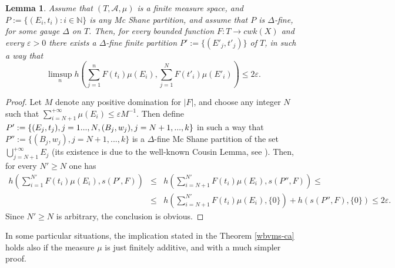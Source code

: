 \documentclass[11pt,a4paper,twoside]{amsart}
\newtheorem{lemma}[theorem]{Lemma}
\begin{document}
\begin{lemma}\label{potyrala}
Assume that $(T,\mathcal{A},\mu)$ is a finite measure space, and $P:=\{(E_i,t_i):i\in \mathbb{N}\}$ is any Mc Shane partition,
and assume that $P$ is $\Delta$-fine, for some gauge $\Delta $ on $T$. Then, for every bounded function $F:T\to cwk(X)$ and every ${\varepsilon}>0$ there exists a $\Delta$-fine finite partition $P':=\{(E'_j,t'_j)\}$ of $T$, in such a way that 
$$\limsup_nh\left(\sum_{j=1}^nF(t_i)\mu(E_i),\sum_{j=1}^NF(t'_i)\mu(E'_i)\right)\leq 2{\varepsilon}.$$
\end{lemma}
\begin{proof}
Let $M$ denote any positive domination for $|F|$, and choose any integer $N$ such that $\sum_{i=N+1}^{+\infty}\mu(E_i)\leq {\varepsilon} M^{-1}.$ Then define $P':=\{(E_j,t_j), j=1...,N, (B_j,w_j), \\ j=N+1,...,k\}$ in such a way that $P'':=\{(B_j,w_j), j=N+1,...,k\}$ is a $\Delta$-fine  Mc Shane partition of the set $\bigcup_{j=N+1}^{+\infty}E_j$ (its existence is due to the well-known Cousin Lemma,  see \cite[ Proposition 1.7]{riecan}). Then, for every $N'\geq N$ one has
\begin{eqnarray*}
h\left(\sum_{i=1}^{N'}F(t_i)\mu(E_i),s(P',F)\right) 
&\leq& h\left(\sum_{i=N+1}^{N'}F(t_i)\mu(E_i),s(P'',F)\right)\leq\\
&\leq&  h\left(\sum_{i=N+1}^{N'}F(t_i)\mu(E_i),\{0\}\right)+
h(s(P'',F),\{0\})\leq  2{\varepsilon}.
\end{eqnarray*}
Since $N'\geq N$ is arbitrary, the conclusion is obvious.
\end{proof}

In some particular situations, the implication stated in the Theorem
\ref{wbvms-ca} holds also if the measure $\mu$ is just finitely additive, and with a much simpler proof.
\end{document}

